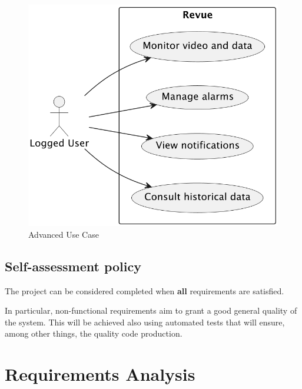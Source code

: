 \documentclass{scrartcl}
\begin{document}
    \begin{figure}
        \centering
        \includegraphics[scale=0.6]{img/advanced-use-case}
        \caption{Advanced Use Case}
        \label{fig:advanced-use-case}
    \end{figure}

    \subsection{Self-assessment policy}

    The project can be considered completed when \textbf{all} requirements are satisfied.

    In particular, non-functional requirements aim to grant a good general quality of the system. This will be achieved also using automated tests that will ensure, among other things, the quality code production.


    \section{Requirements Analysis}

%
%

%
\end{document}

